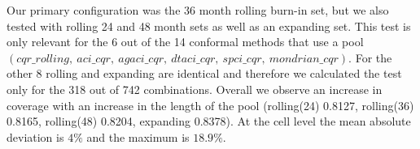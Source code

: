 %
Our primary configuration was the 36 month rolling burn-in set, but we also tested with rolling 24 and 48 month sets as well as an expanding set. This test is only relevant for the 6 out of the 14 conformal methods that use a pool $(cqr\_rolling,\ aci\_cqr,\ agaci\_cqr,\ dtaci\_cqr,\ spci\_cqr,\ mondrian\_cqr)$. For the other 8 rolling and expanding are identical and therefore we calculated the test only for the 318 out of 742 combinations. Overall we observe an increase in coverage with an increase in the length of the pool (rolling(24) 0.8127, rolling(36) 0.8165, rolling(48) 0.8204, expanding 0.8378). At the cell level the mean absolute deviation is $4\%$ and the maximum is $18.9\%$.

